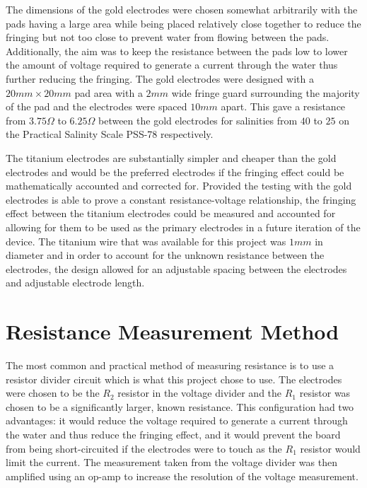 The dimensions of the gold electrodes were chosen somewhat arbitrarily with the pads having a large area while being placed relatively close together to reduce the fringing but not too close to prevent water from flowing between the pads.
Additionally, the aim was to keep the resistance between the pads low to lower the amount of voltage required to generate a current through the water thus further reducing the fringing. 
The gold electrodes were designed with a $20mm \times 20mm$ pad area with a $2mm$ wide fringe guard surrounding the majority of the pad and the electrodes were spaced $10mm$ apart.
This gave a resistance from $3.75\Omega$ to $6.25\Omega$ between the gold electrodes for salinities from $40$ to $25$ on the Practical Salinity Scale PSS-78 respectively.

The titanium electrodes are substantially simpler and cheaper than the gold electrodes and would be the preferred electrodes if the fringing effect could be mathematically accounted and corrected for.
Provided the testing with the gold electrodes is able to prove a constant resistance-voltage relationship, the fringing effect between the titanium electrodes could be measured and accounted for allowing for them to be used as the primary electrodes in a future iteration of the device.
The titanium wire that was available for this project was $1mm$ in diameter and in order to account for the unknown resistance between the electrodes, the design allowed for an adjustable spacing between the electrodes and adjustable electrode length.

\section{Resistance Measurement Method}

The most common and practical method of measuring resistance is to use a resistor divider circuit which is what this project chose to use. 
The electrodes were chosen to be the $R_2$ resistor in the voltage divider and the $R_1$ resistor was chosen to be a significantly larger, known resistance.
This configuration had two advantages: it would reduce the voltage required to generate a current through the water and thus reduce the fringing effect, and it would prevent the board from being short-circuited if the electrodes were to touch as the $R_1$ resistor would limit the current.
The measurement taken from the voltage divider was then amplified using an op-amp to increase the resolution of the voltage measurement.

